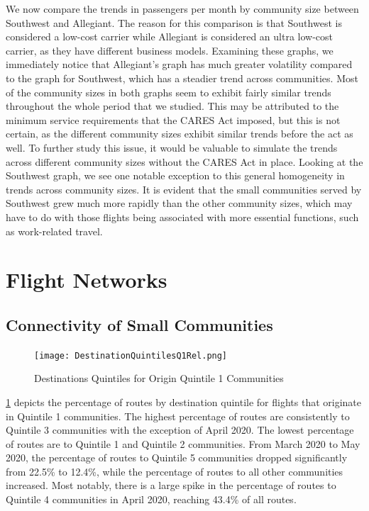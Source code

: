\documentclass[11pt]{article}
\begin{document}
We now compare the trends in passengers per month by community size between Southwest and Allegiant. The reason for this comparison is that Southwest is considered a low-cost carrier while Allegiant is considered an ultra low-cost carrier, as they have different business models. Examining these graphs, we immediately notice that Allegiant’s graph has much greater volatility compared to the graph for Southwest, which has a steadier trend across communities. Most of the community sizes in both graphs seem to exhibit fairly similar trends throughout the whole period that we studied. This may be attributed to the minimum service requirements that the CARES Act imposed, but this is not certain, as the different community sizes exhibit similar trends before the act as well. To further study this issue, it would be valuable to simulate the trends across different community sizes without the CARES Act in place. Looking at the Southwest graph, we see one notable exception to this general homogeneity in trends across community sizes. It is evident that the small communities served by Southwest grew much more rapidly than the other community sizes, which may have to do with those flights being associated with more essential functions, such as work-related travel.

\section{Flight Networks}

\subsection{Connectivity of Small Communities}

\begin{figure}[htbp!]
\centerline{\texttt{[image: DestinationQuintilesQ1Rel.png]}}
\caption{Destinations Quintiles for Origin Quintile 1 Communities}
\label{dest_quint_q1_rel}
\end{figure}

\cref{dest_quint_q1_rel} depicts the percentage of routes by destination quintile for flights that originate in Quintile 1 communities. The highest percentage of routes are consistently to Quintile 3 communities with the exception of April 2020. The lowest percentage of routes are to Quintile 1 and Quintile 2 communities. From March 2020 to May 2020, the percentage of routes to Quintile 5 communities dropped significantly from 22.5\% to 12.4\%, while the percentage of routes to all other communities increased. Most notably, there is a large spike in the percentage of routes to Quintile 4 communities in April 2020, reaching 43.4\% of all routes.
\end{document}
